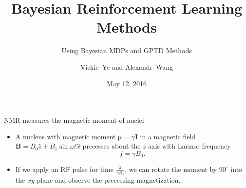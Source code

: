 \documentclass{beamer}
\title { Bayesian Reinforcement Learning Methods }
\subtitle { Using Bayesian MDPs and GPTD Methods }
\author[Vickie Ye and Alexandr Wang]
{ Vickie~Ye and Alexandr~Wang}
\date[Spring 2016]
{ May 12, 2016}
\begin{document}
\begin{frame}
\titlepage
\end{frame}

\begin{frame}{NMR measures the magnetic moment of nuclei}
\begin{minipage}{0.5\textwidth}
\begin{itemize}
\item A nucleus with magnetic moment $\mathbf{\mu} = \gamma \mathbf{I}$ in a magnetic field $\mathbf{B} = B_0 \hat{z} + B_1\sin\omega t \hat{x}$ precesses about the $z$ axis with Larmor frequency 
\begin{equation}
f = \gamma B_0.
\end{equation}
\item If we apply an RF pulse for time $\frac{\pi}{\gamma B_1}$, we can rotate the moment by $90^\circ$ into the $xy$ plane and observe the precessing magnetization. 
\end{itemize}
\end{minipage}%
\end{frame}
\end{document}
